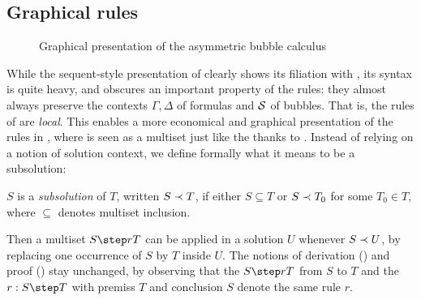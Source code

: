 
\subsection{Graphical rules}

\begin{figure*}
  
  \caption{Graphical presentation of the asymmetric bubble calculus }
\end{figure*}

While the sequent-style presentation of  clearly shows its filiation
with , its syntax is quite heavy, and obscures an important
property of the rules: they almost always preserve the contexts $\Gamma, \Delta$
of formulas and $\mathcal{S}$ of bubbles. That is, the rules of  are
\emph{local}. This enables a more economical and graphical presentation of the
rules in , where  is seen as a multiset  just like the {\cham} thanks to . Instead of relying on
a notion of solution context, we define formally what it means to be a
subsolution:

\begin{definition}[Subsolution]
  $S$ is a \emph{subsolution} of $T$, written $S \prec T$, if either $S
  \subseteq T$ or $S \prec T_0$ for some $T_0 \in T$, where $\subseteq$
  denotes multiset inclusion. 
\end{definition}

Then a multiset  $\rrule{r}{S}{T}$ can be applied in a
solution $U$ whenever $S \prec U$, by replacing one occurrence of $S$ by $T$
inside $U$. The notions of derivation () and proof
() stay unchanged, by observing that the 
$\rrule{r}{S}{T}$ from $S$ to $T$ and the 
$\irule{r}{S}{T}$ with premiss $T$ and conclusion $S$ denote the same
rule $r$.



